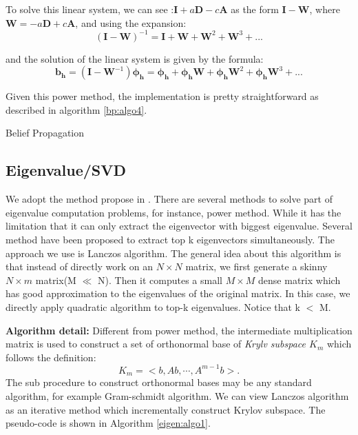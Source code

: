 To solve this linear system, we can see :$\mathbf{I} + a\mathbf{D} - c\mathbf{A}$ as the form $\mathbf{I} - \mathbf{W}$, where $\mathbf{W} = -a\mathbf{D} + c\mathbf{A}$, and using the expansion:$$(\mathbf{I} - \mathbf{W})^{-1} = \mathbf{I} + \mathbf{W} + \mathbf{W}^2 + \mathbf{W}^3 + ...$$

and the solution of the linear system is given by the formula:
$$\mathbf{b_h} = (\mathbf{I} - \mathbf{W}^{-1})\mathbf{\phi_h} =\mathbf{\phi_h}  + \mathbf{\phi_h} \mathbf{W} + \mathbf{\phi_h} \mathbf{W}^2 + \mathbf{\phi_h} \mathbf{W}^3 + ...$$

Given this power method, the implementation is pretty straightforward as described in algorithm \ref{bp:algo4}.
\begin{algorithm}
\caption{Belief Propagation}
\begin{algorithmic}
\REPEAT
{}
\end{algorithmic}
\label{bp:algo4}
\end{algorithm}

\subsection{Eigenvalue/SVD}
We adopt the method propose in \cite{kang2011spectral}. There are several methods to solve part of eigenvalue computation problems, for instance, power method\cite{langville2004deeper}. While it has the limitation that it can only extract the eigenvector with biggest eigenvalue. Several method have been proposed to extract top k eigenvectors simultaneously. The approach we use is Lanczos algorithm\cite{lanczos1950iteration}. The general idea about this algorithm is that instead of directly work on an $N \times N$ matrix, we first generate a skinny $N \times m$ matrix(M $\ll$ N). Then it computes a small $M \times M$ dense matrix which has good approximation to the eigenvalues of the original matrix. In this case, we directly apply quadratic algorithm to top-k eigenvalues. Notice that k $<$ M.

{\bf{Algorithm detail:}} Different from power method, the intermediate multiplication matrix is used to construct a set of orthonormal base of \emph{Krylv subspace $K_{m}$} which follows the definition:
\begin{equation}
K_{m} = < b, Ab, \cdots, A^{m-1}b>.
\end{equation}
The sub procedure to construct orthonormal bases may be any standard algorithm, for example Gram-schmidt algorithm. We can view Lanczos algorithm as an iterative method which incrementally construct Krylov subspace. The pseudo-code is shown in Algorithm \ref{eigen:algo1}.

